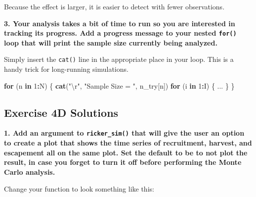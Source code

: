 \documentclass[]{book}
\newenvironment{Shaded}{\begin{snugshade}}{\end{snugshade}}
\newcommand{\KeywordTok}[1]{\textcolor[rgb]{0.13,0.29,0.53}{\textbf{#1}}}
\newcommand{\DecValTok}[1]{\textcolor[rgb]{0.00,0.00,0.81}{#1}}
\newcommand{\CharTok}[1]{\textcolor[rgb]{0.31,0.60,0.02}{#1}}
\newcommand{\StringTok}[1]{\textcolor[rgb]{0.31,0.60,0.02}{#1}}
\newcommand{\ControlFlowTok}[1]{\textcolor[rgb]{0.13,0.29,0.53}{\textbf{#1}}}
\newcommand{\OperatorTok}[1]{\textcolor[rgb]{0.81,0.36,0.00}{\textbf{#1}}}
\newcommand{\NormalTok}[1]{#1}
\theoremstyle{definition}
\theoremstyle{definition}
\theoremstyle{definition}
\theoremstyle{remark}
\begin{document}
Because the effect is larger, it is easier to detect with fewer
observations.

\textbf{3. Your analysis takes a bit of time to run so you are
interested in tracking its progress. Add a progress message to your
nested \texttt{for()} loop that will print the sample size currently
being analyzed.}

Simply insert the \texttt{cat()} line in the appropriate place in your
loop. This is a handy trick for long-running simulations.

\begin{Shaded}
\begin{Highlighting}[]
\ControlFlowTok{for}\NormalTok{ (n }\ControlFlowTok{in} \DecValTok{1}\OperatorTok{:}\NormalTok{N) \{}
  \KeywordTok{cat}\NormalTok{(}\StringTok{"}\CharTok{\textbackslash{}r}\StringTok{"}\NormalTok{, }\StringTok{"Sample Size = "}\NormalTok{, n_try[n])}
  \ControlFlowTok{for}\NormalTok{ (i }\ControlFlowTok{in} \DecValTok{1}\OperatorTok{:}\NormalTok{I) \{}
\NormalTok{    ...}
\NormalTok{  \}}
\NormalTok{\}}
\end{Highlighting}
\end{Shaded}

\hypertarget{ex4d-answers}{\subsection*{Exercise 4D
Solutions}\label{ex4d-answers}}

\textbf{1. Add an argument to \texttt{ricker\_sim()} that will give the
user an option to create a plot that shows the time series of
recruitment, harvest, and escapement all on the same plot. Set the
default to be to not plot the result, in case you forget to turn it off
before performing the Monte Carlo analysis.}

Change your function to look something like this:
\end{document}
